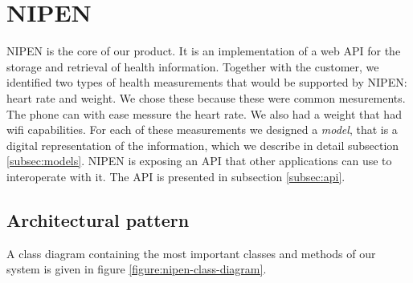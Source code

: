\section{NIPEN}

NIPEN is the core of our product. 
It is an implementation of a web API for the storage and retrieval of health information.
Together with the customer, we identified two types of health measurements that would be supported by NIPEN: heart rate and weight.
We chose these because these were common mesurements.
The phone can with ease messure the heart rate.
We also had a weight that had wifi capabilities.
For each of these measurements we designed a \textit{model}, that is a digital representation of the information, which we describe in detail subsection \ref{subsec:models}.
NIPEN is exposing an API that other applications can use to interoperate with it.
The API is presented in subsection \ref{subsec:api}.


\subsection{Architectural pattern}

A class diagram containing the most important classes and methods of our system is given in figure \ref{figure:nipen-class-diagram}.

